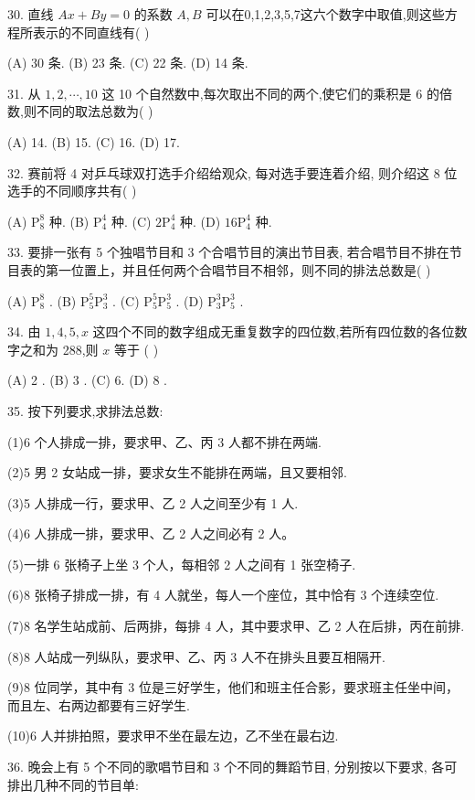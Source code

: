 \documentclass[10pt]{article}
\begin{document}
30. 直线 \({Ax} + {By} = 0\) 的系数 \(A,B\) 可以在0,1,2,3,5,7这六个数字中取值,则这些方程所表示的不同直线有( )

(A) 30 条. (B) 23 条. (C) 22 条. (D) 14 条.

31. 从 \(1,2,\cdots ,{10}\) 这 10 个自然数中,每次取出不同的两个,使它们的乘积是 6 的倍数,则不同的取法总数为( )

(A) 14. (B) 15. (C) 16. (D) 17.

32. 赛前将 4 对乒乓球双打选手介绍给观众, 每对选手要连着介绍, 则介绍这 8 位选手的不同顺序共有( )

(A) \({\mathrm{P}}_{8}^{8}\) 种. (B) \({\mathrm{P}}_{4}^{4}\) 种. (C) \(2{\mathrm{P}}_{4}^{4}\) 种. (D) \({16}{\mathrm{P}}_{4}^{4}\) 种.

33. 要排一张有 5 个独唱节目和 3 个合唱节目的演出节目表, 若合唱节目不排在节目表的第一位置上，并且任何两个合唱节目不相邻，则不同的排法总数是( )

(A) \({\mathrm{P}}_{8}^{8}\) . (B) \({\mathrm{P}}_{5}^{5}{\mathrm{P}}_{3}^{3}\) . (C) \({\mathrm{P}}_{5}^{5}{\mathrm{P}}_{5}^{3}\) . (D) \({\mathrm{P}}_{3}^{3}{\mathrm{P}}_{5}^{3}\) .

34. 由 \(1,4,5,x\) 这四个不同的数字组成无重复数字的四位数,若所有四位数的各位数字之和为 288,则 \(x\) 等于 ( )

(A) 2 . (B) 3 . (C) 6. (D) 8 .

35. 按下列要求,求排法总数:

(1)6 个人排成一排，要求甲、乙、丙 3 人都不排在两端.

(2)5 男 2 女站成一排，要求女生不能排在两端，且又要相邻.

(3)5 人排成一行，要求甲、乙 2 人之间至少有 1 人.

(4)6 人排成一排，要求甲、乙 2 人之间必有 2 人。

(5)一排 6 张椅子上坐 3 个人，每相邻 2 人之间有 1 张空椅子.

(6)8 张椅子排成一排，有 4 人就坐，每人一个座位，其中恰有 3 个连续空位.

(7)8 名学生站成前、后两排，每排 4 人，其中要求甲、乙 2 人在后排，丙在前排.

(8)8 人站成一列纵队，要求甲、乙、丙 3 人不在排头且要互相隔开.

(9)8 位同学，其中有 3 位是三好学生，他们和班主任合影，要求班主任坐中间，而且左、右两边都要有三好学生.

(10)6 人并排拍照，要求甲不坐在最左边，乙不坐在最右边.

36. 晚会上有 5 个不同的歌唱节目和 3 个不同的舞蹈节目, 分别按以下要求, 各可排出几种不同的节目单:
\end{document}
